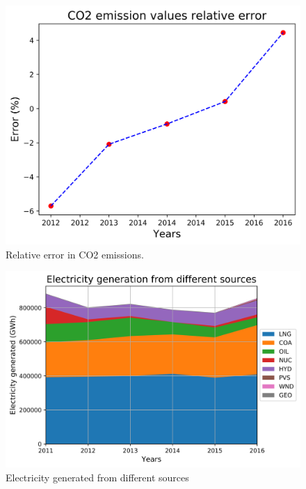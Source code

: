 \documentclass[14pt,a4paper]{article} %
\begin{document}
\begin{figure}[H] \label{co2err}
\centering
\includegraphics[scale=0.6]{co2-err}
\caption{Relative error in CO2 emissions.}
\label{co2err}
\end{figure}

\begin{figure}[H]
\centering
\includegraphics[scale=0.6]{elc-2016}
\caption{Electricity generated from different sources}
\label{elcic}
\end{figure}
\end{document}
